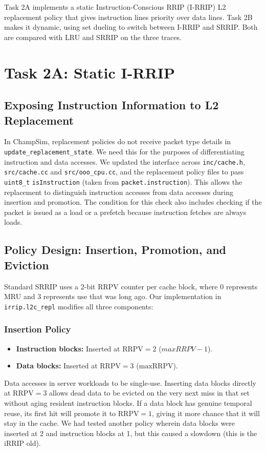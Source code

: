 \documentclass[11pt,a4paper]{article}
\begin{document}
 Task 2A implements a static
Instruction-Conscious RRIP (I-RRIP) L2 replacement policy that gives
instruction lines priority over data lines. Task 2B makes it dynamic,
using set dueling to switch between I-RRIP and SRRIP. Both are compared
with LRU and SRRIP on the three traces.



\section{Task 2A: Static I-RRIP}

\subsection{Exposing Instruction Information to L2 Replacement}
In ChampSim, replacement policies do not receive packet type details in \texttt{update\_replacement\_state}. We need this for the purposes of differentiating instruction and data accesses. We updated the interface across \texttt{inc/cache.h}, \texttt{src/cache.cc} and \texttt{src/ooo\_cpu.cc}, and the replacement policy files to pass \texttt{uint8\_t} \texttt{isInstruction} (taken from \texttt{packet.instruction}). This allows the replacement to distinguish instruction accesses from data accesses during insertion and promotion. The condition for this check also includes checking if the packet is issued as a load or a prefetch because instruction fetches are always loads.

\subsection{Policy Design: Insertion, Promotion, and Eviction}
Standard SRRIP uses a 2-bit RRPV counter per cache block, where 0 represents MRU and 3 represents use that was long ago. Our implementation in \texttt{irrip.l2c\_repl} modifies all three components:

\subsubsection{Insertion Policy}
\begin{itemize}
    \item \textbf{Instruction blocks:} Inserted at $\text{RRPV} = 2$ ($maxRRPV-1$).
    \item \textbf{Data blocks:} Inserted at $\text{RRPV} = 3$ ($\text{maxRRPV}$).
\end{itemize}
Data accesses in server workloads to be single-use. Inserting data blocks directly at $\text{RRPV} = 3$ allows dead data to be evicted on the very next miss in that set without aging resident instruction blocks. If a data block has genuine temporal reuse, its first hit will promote it to $\text{RRPV} = 1$, giving it more chance that it will stay in the cache. We had tested another policy wherein data blocks were inserted at 2 and instruction blocks at 1, but this caused a slowdown (this is the iRRIP old).
\end{document}
